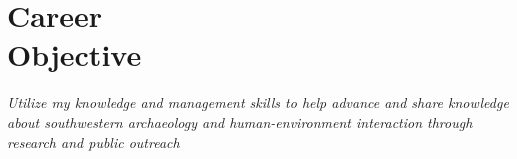 \section{Career \\ Objective}

\emph{Utilize my knowledge and management skills to help advance and share knowledge about southwestern archaeology and human-environment interaction through research and public outreach}
